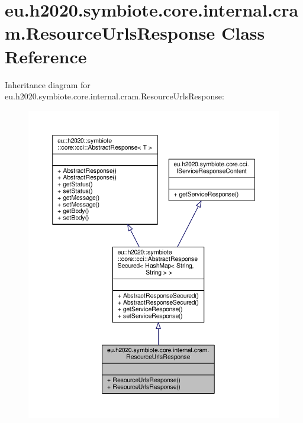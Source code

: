\hypertarget{classeu_1_1h2020_1_1symbiote_1_1core_1_1internal_1_1cram_1_1ResourceUrlsResponse}{}\section{eu.\+h2020.\+symbiote.\+core.\+internal.\+cram.\+Resource\+Urls\+Response Class Reference}
\label{classeu_1_1h2020_1_1symbiote_1_1core_1_1internal_1_1cram_1_1ResourceUrlsResponse}


Inheritance diagram for eu.\+h2020.\+symbiote.\+core.\+internal.\+cram.\+Resource\+Urls\+Response\+:
\nopagebreak
\begin{figure}[H]
\begin{center}
\leavevmode
\includegraphics[width=350pt]{classeu_1_1h2020_1_1symbiote_1_1core_1_1internal_1_1cram_1_1ResourceUrlsResponse__inherit__graph}
\end{center}
\end{figure}


